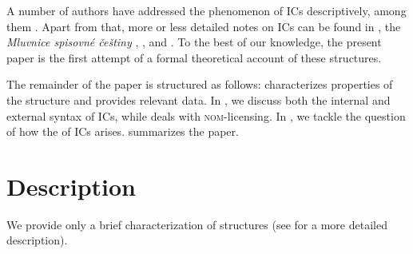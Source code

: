 \documentclass[output=paper,colorlinks,citecolor=brown,newtxmath]{langsci/langscibook}
\begin{document}
\noindent A number of authors have addressed the phenomenon of  ICs descriptively, among them \citet{Svoboda1959,Svoboda1960a,Svoboda1960b,Svoboda1962,Poldauf1959,Porak1959,Kiparsky1960,Kiparsky1967,Dunn1982,Karlik2007,Meyer2010,Milotova2011,Milotova2012}. Apart from that, more or less detailed notes on ICs can be found in \citet{Krizkova1972,Machackova1980}, the \textit{Mluvnice spisovné češtiny} \citep{Travnicek1951}, \citet{BauerGrepl1972}, and \citet{GreplKarlik1998}. To the best of our knowledge, the present paper is the first attempt of a formal theoretical account of these structures.

The remainder of the paper is structured as follows:  characterizes properties of the structure and provides relevant data. In , we discuss both the internal and external syntax of ICs, while  deals with \textsc{nom}-licensing. In , we tackle the question of how the  of ICs arises.  summarizes the paper.

\largerpage
\section{Description}\label{sec:description}

We provide only a brief characterization of   structures (see \citealt{JunghannsPitsch2019} for a more detailed description).
\end{document}

